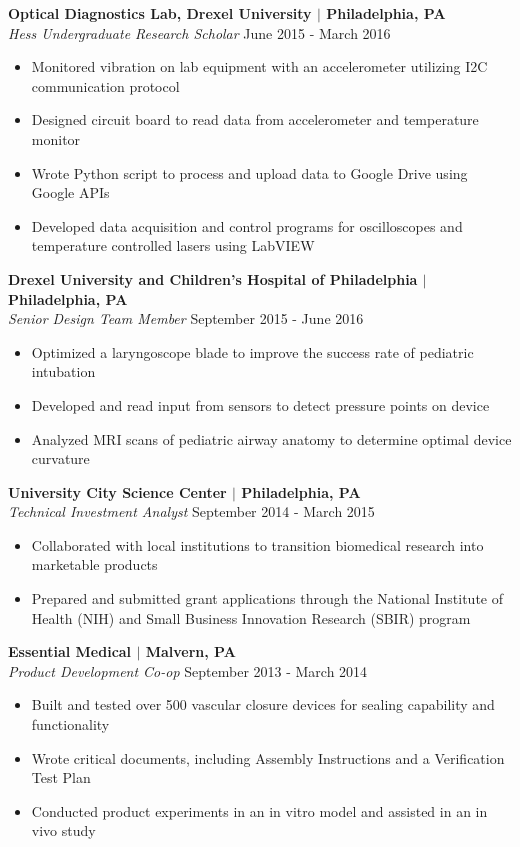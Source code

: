 \documentclass[line,resmargin,11pt]{res}
\begin{document}
\begin{resume}
                \textbf{Optical Diagnostics Lab, Drexel University $|$ Philadelphia, PA} \\
				{\sl Hess Undergraduate Research Scholar} \hfill June 2015 - March 2016
                \begin{itemize}  \itemsep -2pt %
                \item  Monitored vibration on lab equipment with an accelerometer utilizing I2C communication protocol
				\item  Designed circuit board to read data from accelerometer and temperature monitor
				\item  Wrote Python script to process and upload data to Google Drive using Google APIs
				\item  Developed data acquisition and control programs for oscilloscopes and temperature controlled lasers using LabVIEW
                \end{itemize}
                
                \textbf{Drexel University and Children's Hospital of Philadelphia $|$ Philadelphia, PA} \\
				{\sl Senior Design Team Member} \hfill September 2015 - June 2016
				\begin{itemize} \itemsep -2pt
				\item  Optimized a laryngoscope blade to improve the success rate of pediatric intubation
				\item  Developed and read input from sensors to detect pressure points on device
				\item  Analyzed MRI scans of pediatric airway anatomy to determine optimal device curvature
				\end{itemize}
				
				\textbf{University City Science Center $|$ Philadelphia, PA} \\
				{\sl Technical Investment Analyst} \hfill September 2014 - March 2015 
				\begin{itemize} \itemsep -2pt
				\item  Collaborated with local institutions to transition biomedical research into marketable products
				\item  Prepared and submitted grant applications through the National Institute of Health (NIH) and Small Business Innovation Research (SBIR) program
				\end{itemize}
				
				\textbf{Essential Medical $|$ Malvern, PA} \\
				{\sl Product Development Co-op} \hfill September 2013 - March 2014
				\begin{itemize} \itemsep -2pt
				\item  Built and tested over 500 vascular closure devices for sealing capability and functionality
				\item  Wrote critical documents, including Assembly Instructions and a Verification Test Plan
				\item  Conducted product experiments in an in vitro model and assisted in an in vivo study
				\end{itemize}
				

\end{resume}
\end{document}
